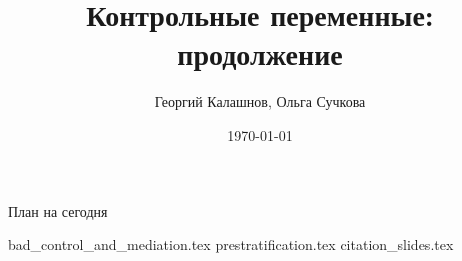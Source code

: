 \documentclass[handout,12pt]{beamer}
\title{Контрольные переменные: продолжение}
\author[Георгий Калашнов, Ольга Сучкова]{Георгий Калашнов, Ольга Сучкова}
\date{\today}
\begin{document}
\begin{frame}
  \titlepage
  \begin{flushright}
  \end{flushright}
\end{frame}


\begin{frame}{План на сегодня} 
\tableofcontents
\end{frame}

{bad_control_and_mediation.tex}
{prestratification.tex}
{citation_slides.tex}
\end{document}

